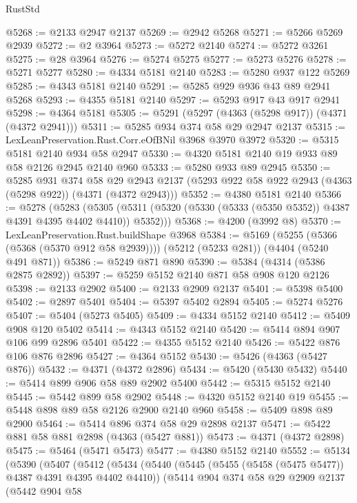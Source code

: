 \begin{lexlean}{RustStd}
\begin{coremodule}
{\begin{coremodule}
{{{{{{{{{{{{{{{{@5268 := @2133 @2947 @2137
@5269 := @2942 @5268
@5271 := @5266 @5269 @2939
@5272 := @2 @3964
@5273 := @5272 @2140
@5274 := @5272 @3261
@5275 := @28 @3964
@5276 := @5274 @5275
@5277 := @5273 @5276
@5278 := @5271 @5277
@5280 := @4334 @5181 @2140
@5283 := @5280 @937 @122 @5269
@5285 := @4343 @5181 @2140
@5291 := @5285 @929 @936 @43 @89 @2941 @5268
@5293 := @4355 @5181 @2140
@5297 := @5293 @917 @43 @917 @2941
@5298 := @4364 @5181
@5305 := @5291 (@5297 (@4363 (@5298 @917)) (@4371 (@4372 @2941)))
@5311 := @5285 @934 @374 @58 @29 @2947 @2137
@5315 := LexLeanPreservation.Rust.Corr.eOfBNil @3968 @3970 @3972
@5320 := @5315 @5181 @2140 @934 @58 @2947
@5330 := @4320 @5181 @2140 @19 @933 @89 @58 @2126 @2945 @2140 @960
@5333 := @5280 @933 @89 @2945
@5350 := @5285
    @931
    @374
    @58
    @29
    @2943
    @2137
    (@5293 @922 @58 @922 @2943 (@4363 (@5298 @922)) (@4371 (@4372 @2943)))
@5352 := @4380 @5181 @2140
@5366 := @5278
    (@5283
      (@5305 (@5311 (@5320 (@5330 (@5333 (@5350 @5352)) @4387 @4391 @4395 @4402 @4410)) @5352)))
@5368 := @4200 (@3992 @8)
@5370 := LexLeanPreservation.Rust.buildShape @3968
@5384 := @5169
    (@5255 (@5366 (@5368 (@5370 @912 @58 @2939))))
    (@5212 (@5233 @281))
    (@4404 (@5240 @491 @871))
@5386 := @5249 @871 @890
@5390 := @5384 (@4314 (@5386 @2875 @2892))
@5397 := @5259 @5152 @2140 @871 @58 @908 @120 @2126
@5398 := @2133 @2902
@5400 := @2133 @2909 @2137
@5401 := @5398 @5400
@5402 := @2897 @5401
@5404 := @5397 @5402 @2894
@5405 := @5274 @5276
@5407 := @5404 (@5273 @5405)
@5409 := @4334 @5152 @2140
@5412 := @5409 @908 @120 @5402
@5414 := @4343 @5152 @2140
@5420 := @5414 @894 @907 @106 @99 @2896 @5401
@5422 := @4355 @5152 @2140
@5426 := @5422 @876 @106 @876 @2896
@5427 := @4364 @5152
@5430 := @5426 (@4363 (@5427 @876))
@5432 := @4371 (@4372 @2896)
@5434 := @5420 (@5430 @5432)
@5440 := @5414 @899 @906 @58 @89 @2902 @5400
@5442 := @5315 @5152 @2140
@5445 := @5442 @899 @58 @2902
@5448 := @4320 @5152 @2140 @19
@5455 := @5448 @898 @89 @58 @2126 @2900 @2140 @960
@5458 := @5409 @898 @89 @2900
@5464 := @5414 @896 @374 @58 @29 @2898 @2137
@5471 := @5422 @881 @58 @881 @2898 (@4363 (@5427 @881))
@5473 := @4371 (@4372 @2898)
@5475 := @5464 (@5471 @5473)
@5477 := @4380 @5152 @2140
@5552 := @5134
    (@5390
      (@5407
        (@5412
          (@5434
            (@5440
              (@5445 (@5455 (@5458 (@5475 @5477)) @4387 @4391 @4395 @4402 @4410))
              (@5414
                @904
                @374
                @58
                @29
                @2909
                @2137
                (@5442
                  @904
                  @58
}}}}}}}}}}}}}}}}
\end{coremodule}}
\end{coremodule}
\end{lexlean}
